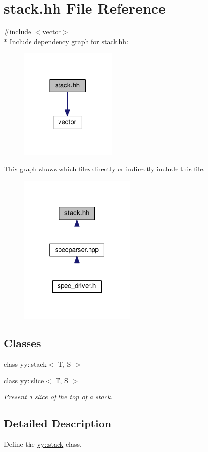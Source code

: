 \hypertarget{stack_8hh}{}\section{stack.\+hh File Reference}
\label{stack_8hh}
{\ttfamily \#include $<$vector$>$}\\*
Include dependency graph for stack.\+hh\+:\nopagebreak
\begin{figure}[H]
\begin{center}
\leavevmode
\includegraphics[width=134pt]{stack_8hh__incl}
\end{center}
\end{figure}
This graph shows which files directly or indirectly include this file\+:\nopagebreak
\begin{figure}[H]
\begin{center}
\leavevmode
\includegraphics[width=163pt]{stack_8hh__dep__incl}
\end{center}
\end{figure}
\subsection*{Classes}
\begin{DoxyCompactItemize}
\item 
class \hyperlink{classyy_1_1stack}{yy\+::stack$<$ T, S $>$}
\item 
class \hyperlink{classyy_1_1slice}{yy\+::slice$<$ T, S $>$}
\begin{DoxyCompactList}\small\item\em Present a slice of the top of a stack. \end{DoxyCompactList}\end{DoxyCompactItemize}


\subsection{Detailed Description}
Define the \hyperlink{classyy_1_1stack}{yy\+::stack} class. 